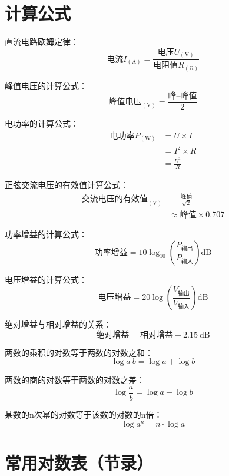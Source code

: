 \section{计算公式}

直流电路欧姆定律：
\[\mbox{电流}I_{(\unit{\ampere})}=\frac{\mbox{电压}U_{(\unit{\volt})}}{\mbox{电阻值}R_{(\unit{\ohm})}}\]

峰值电压的计算公式：
\[\mbox{峰值电压}_{(\unit{\volt})}=\frac{\mbox{峰--峰值}}{2}\]

电功率的计算公式：
\begin{equation*}
  \begin{aligned}
    \mbox{电功率}P_{(\unit{\watt})} & = U\times I     \\
                                 & = I^2 \times R  \\
                                 & = \frac{U^2}{R}
  \end{aligned}
\end{equation*}

正弦交流电压的有效值计算公式：
\begin{equation*}
  \begin{aligned}
    \mbox{交流电压的有效值}_{(\unit{\volt})} & =\frac{\mbox{峰值}}{\sqrt{2}}   \\
                                     & \approx \mbox{峰值}\times 0.707
  \end{aligned}
\end{equation*}

功率增益的计算公式：
\[\mbox{功率增益}=10 \log_{10} \left( {\frac{P_{ \mbox{输出} }}{P_{ \mbox{输入} }}}\right) \unit{\dB}\]

电压增益的计算公式：
\[\mbox{电压增益}=20 \log \left( {\frac{V_{ \mbox{输出} }}{V_{ \mbox{输入} }}} \right) \unit{\dB}\]


绝对增益与相对增益的关系：
\[\mbox{绝对增益} = \mbox{相对增益} + \qty{2.15}{\dB}\]

两数的乘积的对数等于两数的对数之和：
\[\log a\: b=\log a+\log b\]

两数的商的对数等于两数的对数之差：
\[\log\frac{a}{b}=\log a-\log b\]

某数的n次幂的对数等于该数的对数的n倍：
\[\log a^n = n \cdot \log a\]

\newpage

\section{常用对数表（节录）}

